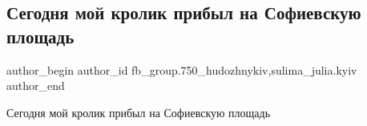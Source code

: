  
 
 
 
 

\subsection{Сегодня мой кролик прибыл на Софиевскую площадь}
\label{sec:03_04_2018.fb.fb_group.750_hudozhnykiv.1.moj_krolik_sofia_ploscha}
 
\ifcmt
 author_begin
   author_id fb_group.750_hudozhnykiv,sulima_julia.kyiv
 author_end
\fi

Сегодня мой кролик прибыл на Софиевскую площадь
